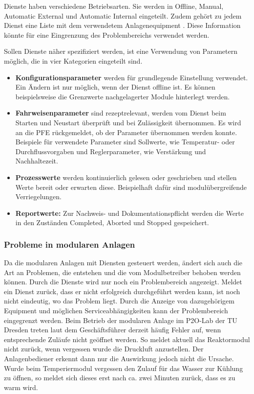 Dienste haben verschiedene Betriebsarten. Sie werden in Offline, Manual, Automatic External und Automatic Internal eingeteilt. Zudem gehört zu jedem Dienst eine Liste mit dem verwendetem Anlagenequipment \cite{VDI2658-Blatt4}. Diese Information könnte für eine Eingrenzung des Problembereichs verwendet werden.

Sollen Dienste näher spezifiziert werden, ist eine Verwendung von Parametern möglich, die in vier Kategorien eingeteilt sind. \cite{VDI2658-Blatt4}
\begin{itemize}
\item \textbf{Konfigurationsparameter} werden für grundlegende Einstellung verwendet. Ein Ändern ist nur möglich, wenn der Dienst offline ist. Es können beispielsweise die Grenzwerte nachgelagerter Module hinterlegt werden. 
\item \textbf{Fahrweisenparameter} sind rezeptrelevant, werden vom Dienst beim Starten und Neustart überprüft und bei Zulässigkeit übernommen. Es wird an die PFE rückgemeldet, ob der Parameter übernommen werden konnte. Beispiele für verwendete Parameter sind Sollwerte, wie Temperatur- oder Durchflussvorgaben und Reglerparameter, wie Verstärkung und Nachhaltezeit.
\item \textbf{Prozesswerte} werden kontinuierlich gelesen oder geschrieben und stellen Werte bereit oder erwarten diese. Beispielhaft dafür sind modulübergreifende Verriegelungen.
\item \textbf{Reportwerte:} Zur Nachweis- und Dokumentationspflicht werden die Werte in den Zuständen Completed, Aborted und Stopped gespeichert.
\end{itemize}

\subsubsection*{Probleme in modularen Anlagen}
\label{Probleme-modulare-Anlage}
Da die modularen Anlagen mit Diensten gesteuert werden, ändert sich auch die Art an Problemen, die entstehen und die vom Modulbetreiber behoben werden können. Durch die Dienste wird nur noch ein Problembereich angezeigt. Meldet ein Dienst zurück, dass er nicht erfolgreich durchgeführt werden kann, ist noch nicht eindeutig, wo das Problem liegt. Durch die Anzeige von dazugehörigem Equipment und möglichen Serviceabhängigkeiten kann der Problembereich eingegrenzt werden. Beim Betrieb der modularen Anlage im P2O-Lab der TU Dresden treten laut dem Geschäftsführer derzeit häufig Fehler auf, wenn entsprechende Zuläufe nicht geöffnet werden. So meldet aktuell das Reaktormodul nicht zurück, wenn vergessen wurde die Druckluft anzustellen. Der Anlagenbediener erkennt dann nur die Auswirkung jedoch nicht die Ursache. Wurde beim Temperiermodul vergessen den Zulauf für das Wasser zur Kühlung zu öffnen, so meldet sich dieses erst nach ca. zwei Minuten zurück, dass es zu warm wird.


